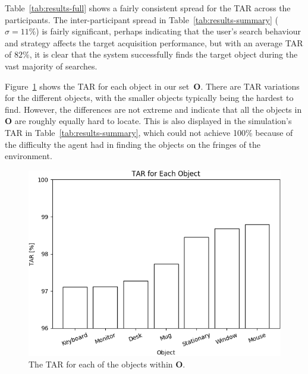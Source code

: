 \documentclass[a4paper, twoside]{article}
\begin{document}

Table~\ref{tab:results-full} shows a fairly consistent spread for the TAR across the participants. The inter-participant spread in Table~\ref{tab:results-summary} ($\sigma=11\%$) is fairly significant, perhaps indicating that the user's search behaviour and strategy affects the target acquisition performance, but with an average TAR of $82\%$, it is clear that the system successfully finds the target object during the vast majority of searches. 

Figure~\ref{fig:tar-objects} shows the TAR for each object in our set~$\mathbf{O}$. There are TAR variations for the different objects, with the smaller objects typically being the hardest to find. However, the differences are not extreme and indicate that all the objects in $\mathbf{O}$ are roughly equally hard to locate. This is also displayed in the simulation's TAR in Table~\ref{tab:results-summary}, which could not achieve 100\% because of the difficulty the agent had in finding the objects on the fringes of the environment. 

\begin{figure}
  \centering
  \includegraphics[width=\columnwidth]{figures/tar_objects.png}
  \caption{The TAR for each of the objects within $\mathbf{O}$. }\label{fig:tar-objects}
\end{figure}
\end{document}
